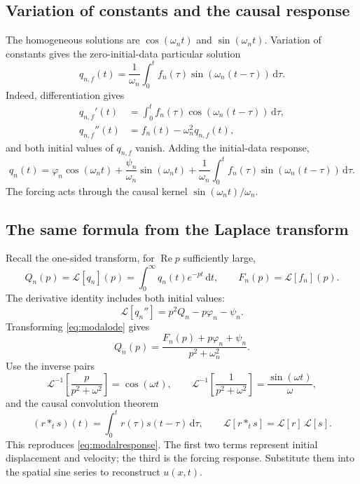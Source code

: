 \documentclass[11pt,a4paper]{article}
\newcommand{\dd}{\,\mathrm{d}}
\begin{document}
\subsection{Variation of constants and the causal response}
The homogeneous solutions are $\cos(\omega_nt)$ and $\sin(\omega_nt)$.
Variation of constants gives the zero-initial-data particular solution
\begin{equation}
 q_{n,f}(t)=\frac1{\omega_n}\int_0^t
                   f_n(\tau)\sin(\omega_n(t-\tau))\dd\tau.
\end{equation}
Indeed, differentiation gives
\begin{align}
 q_{n,f}'(t)&=\int_0^t f_n(\tau)\cos(\omega_n(t-\tau))\dd\tau,\\
 q_{n,f}''(t)&=f_n(t)-\omega_n^2q_{n,f}(t),
\end{align}
and both initial values of $q_{n,f}$ vanish. Adding the initial-data response,
\begin{equation}\label{eq:modalresponse}
 q_n(t)=\varphi_n\cos(\omega_nt)+\frac{\psi_n}{\omega_n}\sin(\omega_nt)
       +\frac1{\omega_n}\int_0^t f_n(\tau)\sin(\omega_n(t-\tau))\dd\tau.
\end{equation}
The forcing acts through the causal kernel $\sin(\omega_nt)/\omega_n$.

\subsection{The same formula from the Laplace transform}
Recall the one-sided transform, for $\operatorname{Re}p$ sufficiently large,
\begin{equation}
 Q_n(p)=\mathcal L[q_n](p)=\int_0^\infty q_n(t)e^{-pt}\dd t,\qquad
 F_n(p)=\mathcal L[f_n](p).
\end{equation}
The derivative identity includes both initial values:
\begin{equation}
 \mathcal L[q_n'']=p^2Q_n-p\varphi_n-\psi_n.
\end{equation}
Transforming \eqref{eq:modalode} gives
\begin{equation}
 Q_n(p)=\frac{F_n(p)+p\varphi_n+\psi_n}{p^2+\omega_n^2}.
\end{equation}
Use the inverse pairs
\begin{equation}
 \mathcal L^{-1}\!\left[\frac p{p^2+\omega^2}\right]=\cos(\omega t),\qquad
 \mathcal L^{-1}\!\left[\frac1{p^2+\omega^2}\right]=\frac{\sin(\omega t)}\omega,
\end{equation}
and the causal convolution theorem
\begin{equation}
 (r*_t s)(t)=\int_0^t r(\tau)s(t-\tau)\dd\tau,\qquad
 \mathcal L[r*_t s]=\mathcal L[r]\,\mathcal L[s].
\end{equation}
This reproduces \eqref{eq:modalresponse}. The first two terms represent initial
displacement and velocity; the third is the forcing response. Substitute them
into the spatial sine series to reconstruct $u(x,t)$.
\end{document}
